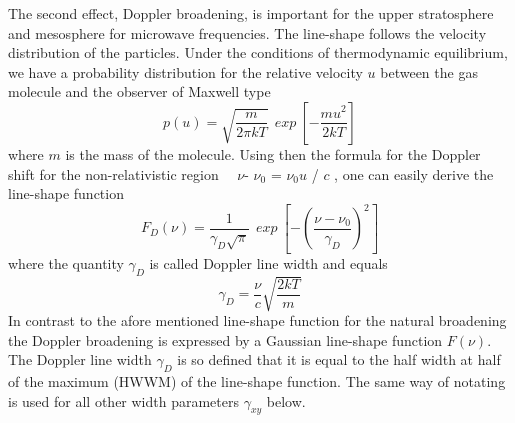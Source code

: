 The second effect, Doppler broadening, is important for the upper
stratosphere and mesosphere for microwave frequencies. The line-shape
follows the velocity distribution of the particles. Under the conditions
of thermodynamic equilibrium, we have  a probability distribution for
the relative velocity $u$ between the gas molecule and the observer 
of Maxwell type 
\begin{equation}
  p(u)=\sqrt{\frac{m}{2\pi kT}}~~exp~\left[-\frac{mu^2}{2kT}\right]
\end{equation}
where $m$ is the mass of the molecule. Using then the formula for the
Doppler shift for the non-relativistic region~~  $\nu$- $\nu_0$ =
$\nu_0$$u$ / $c$ , one can easily derive the line-shape function 
\begin{equation}
 F_D(\nu)=\frac{1}{\gamma_D\sqrt{\pi}}~~exp~\left[-\left(\frac{\nu - \nu_0}{\gamma_D}\right)^2\right]
\end{equation}
where the quantity $\gamma_D$ is called Doppler line width and equals
\begin{equation}
 \gamma_D=\frac{\nu}{c}\sqrt{\frac{2kT}{m}}
\end{equation}
In contrast to the afore mentioned line-shape function for the natural
broadening the Doppler broadening is expressed by a Gaussian
line-shape function $F(\nu)$. The Doppler line width $\gamma_D$ is so
defined that it is equal to the half width at half of the maximum
(HWWM) of the line-shape function. The same way of notating is used
for all other width parameters $\gamma_{xy}$ below.

